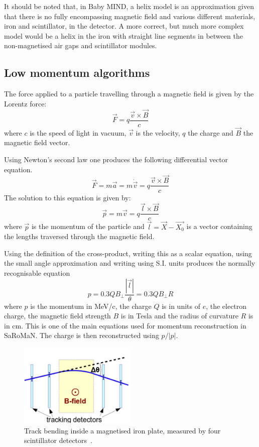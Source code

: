 It should be noted that, in Baby MIND, a helix model is an approximation given that there is no fully encompassing magnetic field and various different materials, iron and scintillator, in the detector. A more correct, but much more complex model would be a helix in the iron with straight line segments in between the non-magnetised air gaps and scintillator modules.

\subsection{Low momentum algorithms}
The force applied to a particle travelling through a magnetic field is given by the Lorentz force:
\begin{equation}
\vec{F}=q\frac{\vec{v}\times\vec{B}}{c}
\end{equation}
where $c$ is the speed of light in vacuum, $\vec{v}$ is the velocity, $q$ the charge and $\vec{B}$ the magnetic field vector.

Using Newton's second law one produces the following differential vector equation.
\begin{equation}
\vec{F}=m\vec{a}=m\dot{\vec{v}}=q\frac{\vec{v}\times\vec{B}}{c}
\end{equation}
The solution to this equation is given by:
\begin{equation}
\vec{p}=m\vec{v}=q\frac{\vec{l}\times\vec{B}}{c}
\end{equation} 
where $\vec{p}$ is the momentum of the particle and $\vec{l}=\vec{X}-\vec{X_0}$ is a vector containing the lengths traversed through the magnetic field.

Using the definition of the cross-product, writing this as a scalar equation, using the small angle approximation and writing using S.I. units produces the normally recognisable equation
\begin{equation}
p = 0.3 QB_\bot \frac{|\vec{l}|}{\theta}=0.3 QB_\bot R
\end{equation}
where $p$ is the momentum in MeV/c, the charge $Q$ is in units of $e$, the electron charge, the magnetic field strength $B$ is in Tesla and the radius of curvature $R$ is in cm. This is one of the main equations used for momentum reconstruction in SaRoMaN. The charge is then reconstructed using $p/|p|$. 

\begin{figure}[h!]
\centering
\includegraphics[width=0.5\textwidth]{figures/lowP/scattering.jpeg}
\caption{Track bending inside a magnetised iron plate, measured by four scintillator detectors~\cite{117SABA}.}
\label{fig:Scattering}
\end{figure}

